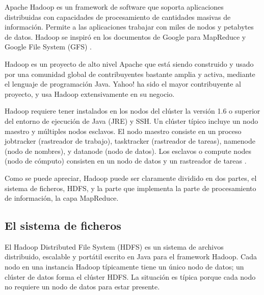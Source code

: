 Apache Hadoop es un framework de software que soporta aplicaciones distribuidas con capacidades de procesamiento de cantidades masivas de información. Permite a las aplicaciones trabajar con miles de nodos y petabytes de datos. Hadoop se inspiró en los documentos de Google para MapReduce \cite{paper-mapreduce} y Google File System (GFS) \cite{paper-gfs}.

Hadoop es un proyecto de alto nivel Apache que está siendo construido y usado por una comunidad global de contribuyentes bastante amplia y activa, mediante el lenguaje de programación Java. Yahoo! ha sido el mayor contribuyente al proyecto, y usa Hadoop extensivamente en su negocio.


Hadoop requiere tener instalados en los nodos del clúster la versi\'on 1.6 o superior del entorno de ejecuci\'on de Java (JRE) y SSH. Un clúster típico incluye un nodo maestro y múltiples nodos esclavos. El nodo maestro consiste en un proceso jobtracker (rastreador de trabajo), tasktracker (rastreador de tareas), namenode (nodo de nombres), y datanode (nodo de datos). Los esclavos o compute nodes (nodo de cómputo) consisten en un nodo de datos y un rastreador de tareas . 

Como se puede apreciar, Hadoop puede ser claramente dividido en dos partes, el sistema de ficheros, HDFS, y la parte que implementa la parte de procesamiento de información, la capa MapReduce.

\subsection{El sistema de ficheros}

El Hadoop Distributed File System (HDFS) es un sistema de archivos distribuido, escalable y portátil escrito en Java para el framework Hadoop. Cada nodo en una instancia Hadoop típicamente tiene un único nodo de datos; un clúster de datos forma el clúster HDFS. La situación es típica porque cada nodo no requiere un nodo de datos para estar presente. 


